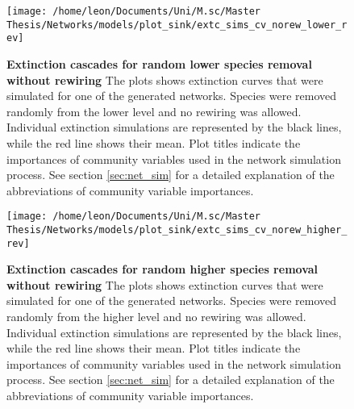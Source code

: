 \documentclass[12pt,a4paper]{article}
\begin{document}
\begin{figure}[H]
	 \centering
	 \texttt{[image: /home/leon/Documents/Uni/M.sc/Master Thesis/Networks/models/plot\_sink/extc\_sims\_cv\_norew\_lower\_rev]}
	 \captionsetup{width = \textwidth}
	 \caption[Extinction cascades for random lower species removal without rewiring]{\textbf{Extinction cascades for random lower species removal without rewiring} The plots shows extinction curves that were simulated for one of the generated networks. Species were removed randomly from the lower level and no rewiring was allowed. Individual extinction simulations are represented by the black lines, while the red line shows their mean. Plot titles indicate the importances of community variables used in the network simulation process. See section \ref{sec:net_sim} for a detailed explanation of the abbreviations of community variable importances.}
	 \label{fig:extc_cv_norew_lower}
\end{figure}


\begin{figure}[H]
	 \centering
	 \texttt{[image: /home/leon/Documents/Uni/M.sc/Master Thesis/Networks/models/plot\_sink/extc\_sims\_cv\_norew\_higher\_rev]}
	 \captionsetup{width = \textwidth}
	 \caption[Extinction cascades for random higher species removal without rewiring]{\textbf{Extinction cascades for random higher species removal without rewiring} The plots shows extinction curves that were simulated for one of the generated networks. Species were removed randomly from the higher level and no rewiring was allowed. Individual extinction simulations are represented by the black lines, while the red line shows their mean. Plot titles indicate the importances of community variables used in the network simulation process. See section \ref{sec:net_sim} for a detailed explanation of the abbreviations of community variable importances.}
	 \label{fig:extc_cv_norew_higher}
\end{figure}
\end{document}
